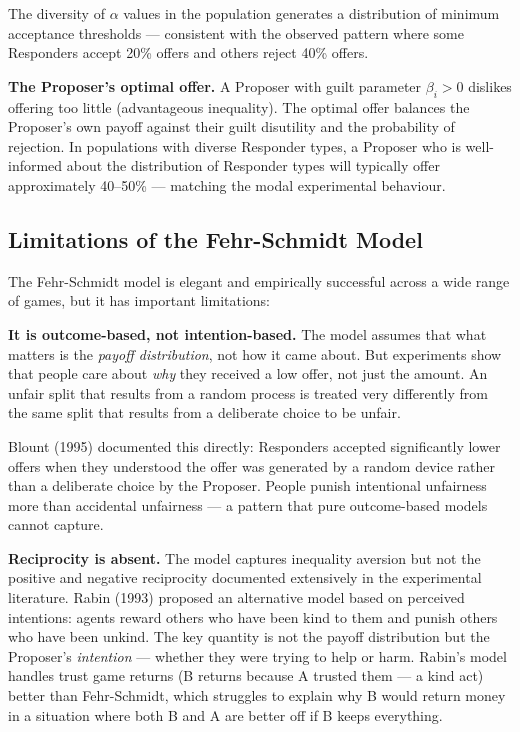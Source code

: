 \documentclass[12pt, letterpaper]{article}
\begin{document}
The diversity of $\alpha$ values in the population generates a distribution of minimum acceptance thresholds --- consistent with the observed pattern where some Responders accept 20\% offers and others reject 40\% offers.

\textbf{The Proposer's optimal offer.} A Proposer with guilt parameter $\beta_i > 0$ dislikes offering too little (advantageous inequality). The optimal offer balances the Proposer's own payoff against their guilt disutility and the probability of rejection. In populations with diverse Responder types, a Proposer who is well-informed about the distribution of Responder types will typically offer approximately 40--50\% --- matching the modal experimental behaviour.


\subsection{Limitations of the Fehr-Schmidt Model}


The Fehr-Schmidt model is elegant and empirically successful across a wide range of games, but it has important limitations:

\textbf{It is outcome-based, not intention-based.} The model assumes that what matters is the \textit{payoff distribution}, not how it came about. But experiments show that people care about \textit{why} they received a low offer, not just the amount. An unfair split that results from a random process is treated very differently from the same split that results from a deliberate choice to be unfair.

Blount (1995) documented this directly: Responders accepted significantly lower offers when they understood the offer was generated by a random device rather than a deliberate choice by the Proposer. People punish intentional unfairness more than accidental unfairness --- a pattern that pure outcome-based models cannot capture.

\textbf{Reciprocity is absent.} The model captures inequality aversion but not the positive and negative reciprocity documented extensively in the experimental literature. Rabin (1993) proposed an alternative model based on perceived intentions: agents reward others who have been kind to them and punish others who have been unkind. The key quantity is not the payoff distribution but the Proposer's \textit{intention} --- whether they were trying to help or harm. Rabin's model handles trust game returns (B returns because A trusted them --- a kind act) better than Fehr-Schmidt, which struggles to explain why B would return money in a situation where both B and A are better off if B keeps everything.
\end{document}
